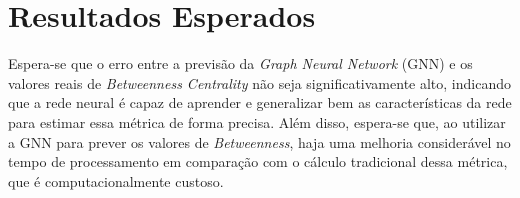 \documentclass[12pt]{article}
\begin{document}

\section{Resultados Esperados}

Espera-se que o erro entre a previsão da \textit{Graph Neural Network} (GNN) e os valores reais de \textit{Betweenness Centrality} não seja significativamente alto, indicando que a rede neural é capaz de aprender e generalizar bem as características da rede para estimar essa métrica de forma precisa. Além disso, espera-se que, ao utilizar a GNN para prever os valores de \textit{Betweenness}, haja uma melhoria considerável no tempo de processamento em comparação com o cálculo tradicional dessa métrica, que é computacionalmente custoso.


    


\printbibliography  %
\end{document}
